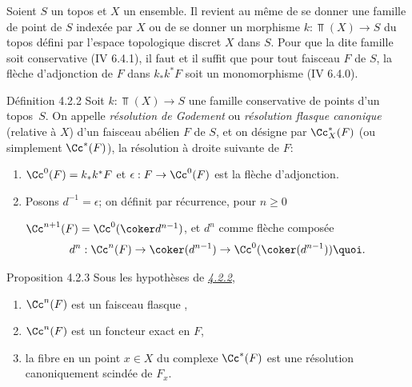 \documentclass[10pt]{../fichiers-configuration-latex/smfart}
\begin{document}
\subsubsection{}
Soient $S$ un topos et $X$ un ensemble. Il revient au même de se
donner une famille de point de $S$ indexée par $X$ ou de se donner un
morphisme $k:\Top(X)\rightarrow S$ du topos défini par l'espace
topologique discret $X$ dans $S$. Pour que la dite famille soit
conservative (IV 6.4.1), il faut et il suffit que pour tout faisceau
$F$ de $S$, la flèche d'adjonction de $F$ dans $k_{\ast}k^{\ast}F$
soit un monomorphisme (\cf IV 6.4.0).

\begin{enonce*}{Définition 4.2.2}
Soit $k:\Top(X)\rightarrow S$ une famille conservative de points d'un
topos~$S$. On appelle \emph{résolution de Godement} ou
\emph{résolution flasque canonique} (relative à $X$) d'un faisceau
abélien $F$ de $S$, et on désigne par $\Cc^{\ast}_X(F)$ (ou
simplement $\Cc^{\ast}(F)$), la résolution à droite suivante
de $F$:
\begin{enumerate}
\renewcommand{\labelenumi}{\theenumi)}
\item $\Cc^{0}(F)=k_{\ast}k^{\ast}F$ et
$\epsilon:F\rightarrow \Cc^{0}(F)$ est la flèche
d'adjonction.

\item Posons $d^{-1}=\epsilon$; on définit par récurrence, pour $n\geq
0$

$\Cc^{n+1}(F)=\Cc^{0}(\coker d^{n-1})$, et
$d^{n}$ comme flèche composée
\[
d^{n}:\Cc^n(F)\rightarrow
\coker(d^{n-1})\rightarrow \Cc^{0}(\coker(d^{n-1})){\quoi}.
\]
\end{enumerate}
\end{enonce*}

\begin{enonce*}{Proposition 4.2.3}
Sous les hypothèses de \emph{\hyperref[XVII.def4.2.2]{4.2.2}},
\begin{enumerate}
\renewcommand{\theenumi}{\roman{enumi}}
\renewcommand{\labelenumi}{(\theenumi)}
\item $\Cc^n(F)$ est un faisceau flasque \emph{},

\item $\Cc^{n}(F)$ est un foncteur exact en $F$,

\item la fibre en un point $x\in X$ du complexe
$\Cc^{\ast}(F)$ est une résolution canoniquement scindée de $F_x$.
\end{enumerate}
\end{enonce*}
\end{document}
